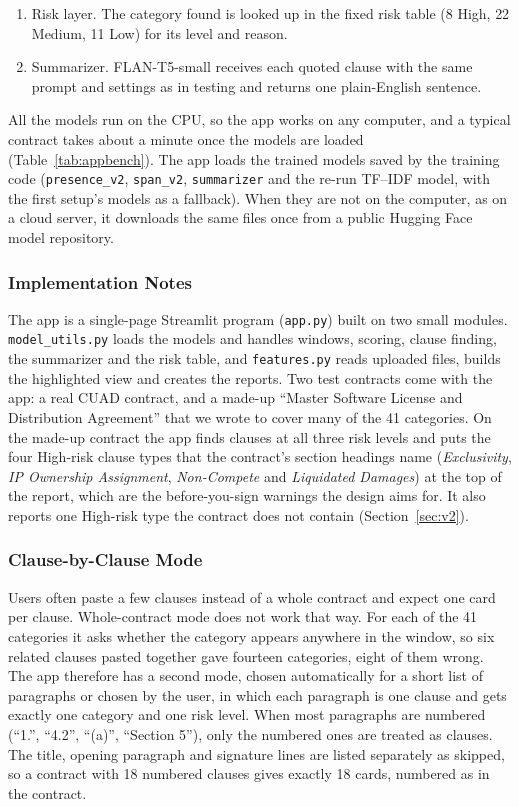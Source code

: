 \begin{enumerate}[itemsep=2pt]
  \item Risk layer. The category found is looked up in the fixed risk table (8 High, 22 Medium, 11 Low) for its level and reason.
  \item Summarizer. FLAN-T5-small receives each quoted clause with the same prompt and settings as in testing and returns one plain-English sentence.
\end{enumerate}

All the models run on the CPU, so the app works on any computer, and a typical contract takes about a minute once the models are loaded (Table~\ref{tab:appbench}). The app loads the trained models saved by the training code (\texttt{presence\_v2}, \texttt{span\_v2}, \texttt{summarizer} and the re-run TF--IDF model, with the first setup's models as a fallback). When they are not on the computer, as on a cloud server, it downloads the same files once from a public Hugging Face model repository.
\subsubsection{Implementation Notes}
The app is a single-page Streamlit program (\texttt{app.py}) built on two small modules. \texttt{model\_utils.py} loads the models and handles windows, scoring, clause finding, the summarizer and the risk table, and \texttt{features.py} reads uploaded files, builds the highlighted view and creates the reports. Two test contracts come with the app: a real CUAD contract, and a made-up ``Master Software License and Distribution Agreement'' that we wrote to cover many of the 41 categories. On the made-up contract the app finds clauses at all three risk levels and puts the four High-risk clause types that the contract's section headings name (\emph{Exclusivity}, \emph{IP Ownership Assignment}, \emph{Non-Compete} and \emph{Liquidated Damages}) at the top of the report, which are the before-you-sign warnings the design aims for. It also reports one High-risk type the contract does not contain (Section~\ref{sec:v2}).
\subsubsection{Clause-by-Clause Mode}
\label{sec:clausemode}
Users often paste a few clauses instead of a whole contract and expect one card per clause. Whole-contract mode does not work that way. For each of the 41 categories it asks whether the category appears anywhere in the window, so six related clauses pasted together gave fourteen categories, eight of them wrong. The app therefore has a second mode, chosen automatically for a short list of paragraphs or chosen by the user, in which each paragraph is one clause and gets exactly one category and one risk level. When most paragraphs are numbered (``1.'', ``4.2'', ``(a)'', ``Section 5''), only the numbered ones are treated as clauses. The title, opening paragraph and signature lines are listed separately as skipped, so a contract with 18 numbered clauses gives exactly 18 cards, numbered as in the contract.

